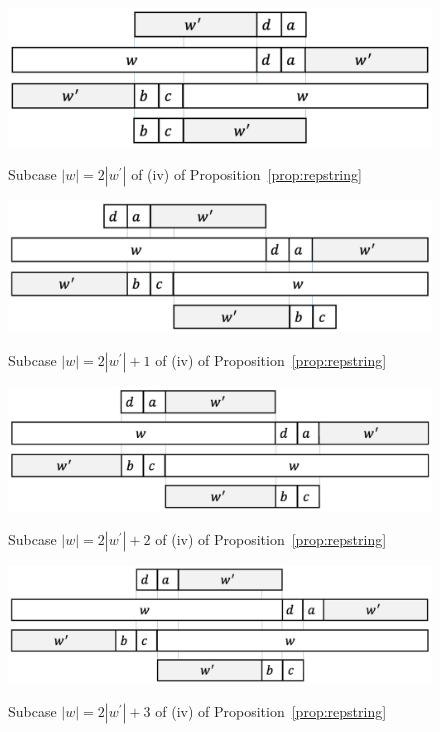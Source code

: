 \begin{figure}[t]
\begin{center}
  \includegraphics[scale=0.345]{figs/w=2w_1.pdf}
  \caption{Subcase $|w| = 2|w^{\prime}|$ of (iv) of Proposition~\ref{prop:repstring}}\label{fig:prop_pic14}
  \bigskip
  \includegraphics[scale=0.345]{figs/w=2w_1+1.pdf}
  \caption{Subcase $|w| = 2|w^{\prime}| + 1$ of (iv) of Proposition~\ref{prop:repstring}}\label{fig:prop_pic13}
  \bigskip
  \includegraphics[scale=0.345]{figs/w=2w_1+2.pdf}
  \caption{Subcase $|w| = 2|w^{\prime}| + 2$ of (iv) of Proposition~\ref{prop:repstring}}\label{fig:prop_pic12}
  \bigskip
  \includegraphics[scale=0.345]{figs/w=2w_1+3.pdf}
  \caption{Subcase $|w| = 2|w^{\prime}| + 3$ of (iv) of Proposition~\ref{prop:repstring}}\label{fig:prop_pic11}
\end{center}
\end{figure}

